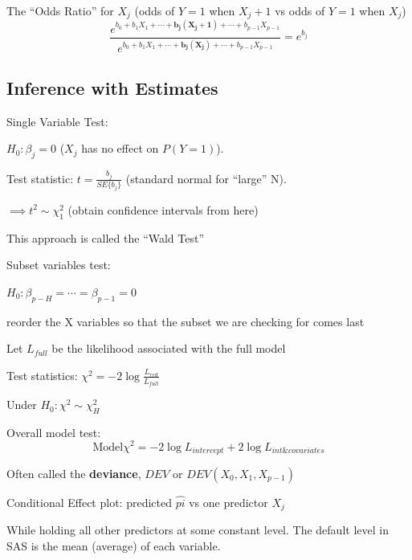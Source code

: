 \documentclass[12pt]{notes}
\begin{document}

\begin{minipage}[l][2cm][c]{\textwidth}
\end{minipage}

\bi
\item The ``Odds Ratio'' for $X_j$ (odds of $Y=1$ when $X_j + 1$ vs odds of $Y=1$ when $X_j$)
$$\frac{e^{b_0 + b_1X_1 + \cdots + \mathbf{b_j(X_j + 1)} + \cdots + b_{p-1}X_{p-1}}}{e^{b_0 + b_1X_1 + \cdots + \mathbf{b_j(X_j)} + \cdots + b_{p-1}X_{p-1}}} = e^{b_j}$$
\ei

\subsection{Inference with Estimates}
\bi
\item Single Variable Test:
\bi
\item $H_0: \beta_j = 0$ ($X_j$ has no effect on $P(Y=1)$). 
\item Test statistic: $t = \frac{b_j}{SE\{b_j\}}$ (standard normal for ``large'' N). 
\item $\implies t^2 \sim \chi^2_1$ (obtain confidence intervals from here)
\bi
\item This approach is called the ``Wald Test''
\ei
\ei
\item Subset variables test:
\bi
\item $H_0: \beta_{p-H} = \cdots = \beta_{p-1} = 0$
\bi
\item reorder the X variables so that the subset we are checking for comes last
\ei
\item Let $L_{full}$ be the likelihood associated with the full model
\item Test statistics: $\chi^2 = -2\log\frac{L_{red}}{L_{full}}$
\item Under $H_0: \chi^2 \sim \chi^2_H$
\ei
\item Overall model test:
$$\text{Model} \chi^2 = -2\log L_{intercept} + 2\log L_{int \& covariates}$$
\bi
\item Often called the \textbf{deviance}, $DEV$ or $DEV(X_0, X_1, X_{p-1})$
\ei
\item Conditional Effect plot: predicted $\hat{pi}$ vs one predictor $X_j$
\bi
\item While holding all other predictors at some constant level. The default level in SAS is the mean (average) of each variable. 
\ei
\ei
\end{document}
